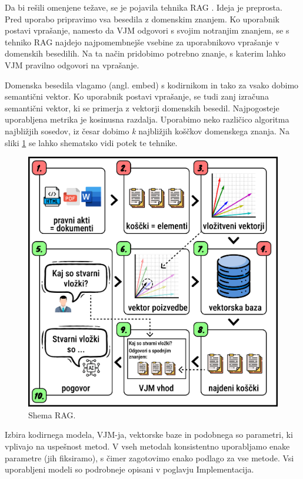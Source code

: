 \documentclass[a4paper,12pt,openright]{book}
\begin{document}
Da bi rešili omenjene težave, se je pojavila tehnika RAG \cite{rag}. Ideja je preprosta. Pred uporabo pripravimo vsa besedila z domenskim znanjem. Ko uporabnik postavi vprašanje, namesto da VJM odgovori s svojim notranjim znanjem, se s tehniko RAG najdejo najpomembnejše vsebine za uporabnikovo vprašanje v domenskih besedilih. Na ta način pridobimo potrebno znanje, s katerim lahko VJM pravilno odgovori na vprašanje.

Domenska besedila vlagamo (angl. embed) s kodirnikom in tako za vsako dobimo semantični vektor. Ko uporabnik postavi vprašanje, se tudi zanj izračuna semantični vektor, ki se primerja z vektorji domenskih besedil. Najpogosteje uporabljena metrika je kosinusna razdalja. Uporabimo neko različico algoritma najbližjih sosedov, iz česar dobimo \textit{k} najbližjih koščkov domenskega znanja. Na sliki \ref{rag_shema} se lahko shematsko vidi potek te tehnike.

\begin{figure}[htbp]
	\centering
	\includegraphics[width=\textwidth]{rag_shema.png}
	\caption{Shema RAG.}
	\label{rag_shema}
\end{figure}

Izbira kodirnega modela, VJM-ja, vektorske baze in podobnega so parametri, ki vplivajo na uspešnost metod. V vseh metodah konsistentno uporabljamo enake parametre (jih fiksiramo), s čimer zagotovimo enako podlago za vse metode. Vsi uporabljeni modeli so podrobneje opisani v poglavju Implementacija.
\end{document}
